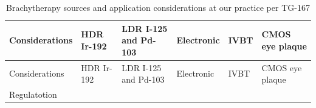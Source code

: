 \documentclass[]{book}
\theoremstyle{definition}
\theoremstyle{definition}
\theoremstyle{definition}
\theoremstyle{remark}
\begin{document}
\begin{longtable}[]{@{}llllll@{}}
\caption{\label{tab:tg167} Brachytherapy sources and application
considerations at our practice per TG-167}\tabularnewline
\toprule
\begin{minipage}[b]{0.14\columnwidth}\raggedright\strut
Considerations\strut
\end{minipage} & \begin{minipage}[b]{0.11\columnwidth}\raggedright\strut
HDR Ir-192\strut
\end{minipage} & \begin{minipage}[b]{0.12\columnwidth}\raggedright\strut
LDR I-125 and Pd-103\strut
\end{minipage} & \begin{minipage}[b]{0.15\columnwidth}\raggedright\strut
Electronic\strut
\end{minipage} & \begin{minipage}[b]{0.16\columnwidth}\raggedright\strut
IVBT\strut
\end{minipage} & \begin{minipage}[b]{0.15\columnwidth}\raggedright\strut
CMOS eye plaque\strut
\end{minipage}\tabularnewline
\midrule
\endfirsthead
\toprule
\begin{minipage}[b]{0.14\columnwidth}\raggedright\strut
Considerations\strut
\end{minipage} & \begin{minipage}[b]{0.11\columnwidth}\raggedright\strut
HDR Ir-192\strut
\end{minipage} & \begin{minipage}[b]{0.12\columnwidth}\raggedright\strut
LDR I-125 and Pd-103\strut
\end{minipage} & \begin{minipage}[b]{0.15\columnwidth}\raggedright\strut
Electronic\strut
\end{minipage} & \begin{minipage}[b]{0.16\columnwidth}\raggedright\strut
IVBT\strut
\end{minipage} & \begin{minipage}[b]{0.15\columnwidth}\raggedright\strut
CMOS eye plaque\strut
\end{minipage}\tabularnewline
\midrule
\endhead
\begin{minipage}[t]{0.14\columnwidth}\raggedright\strut
Regulatotion\strut
\end{minipage} & \begin{minipage}[t]{0.11\columnwidth}\raggedright\strut

\end{minipage}
\end{longtable}
\end{document}
